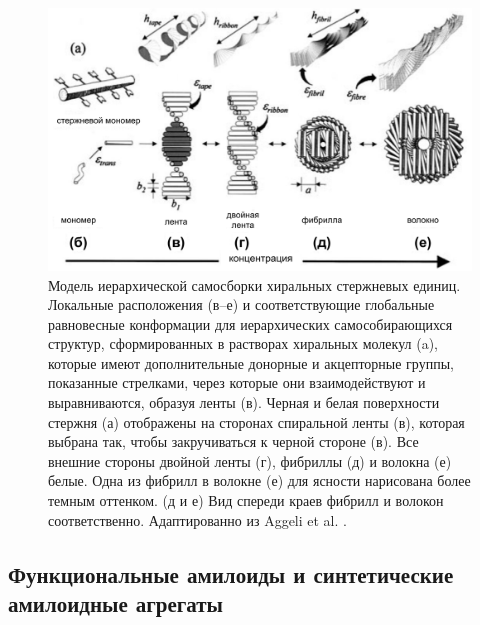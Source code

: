 \begin{figure} [H]
    \centering
    \includegraphics[width=\textwidth]{images/p4/punkt1/part4_p1_f5.pdf}
    \caption[Модель иерархической самосборки хиральных стержневых единиц]{Модель иерархической самосборки хиральных стержневых единиц. Локальные расположения (в–е) и соответствующие глобальные равновесные конформации для иерархических самособирающихся структур, сформированных в растворах хиральных молекул (a), которые имеют дополнительные донорные и акцепторные группы, показанные стрелками, через которые они взаимодействуют и выравниваются, образуя ленты (в). Черная и белая поверхности стержня (а) отображены на сторонах спиральной ленты (в), которая выбрана так, чтобы закручиваться к черной стороне (в). Все внешние стороны двойной ленты (г), фибриллы (д) и волокна (е) белые. Одна из фибрилл в волокне (е) для ясности нарисована более темным оттенком. (д и е) Вид спереди краев фибрилл и волокон соответственно. Адаптированно из Aggeli et al. \cite{aggeli_hierarchical_2001}.}
    \label{fig:p4_p1_f5}
\end{figure}





\subsection{Функциональные амилоиды и синтетические амилоидные агрегаты}

